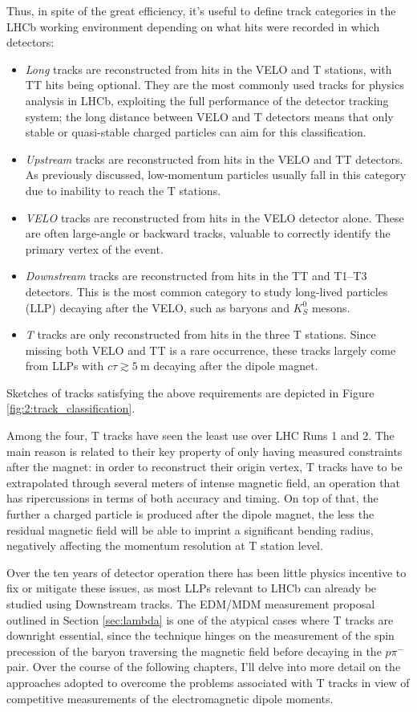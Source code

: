 Thus, in spite of the great efficiency, it's useful to define track categories in the LHCb working environment depending on what hits were recorded in which detectors:
\begin{itemize}
	\item \textit{Long} tracks are reconstructed from hits in the VELO and T stations, with TT hits being optional. They are the most commonly used tracks for physics analysis in LHCb, exploiting the full performance of the detector tracking system; the long distance between VELO and T detectors means that only stable or quasi-stable charged particles can aim for this classification.
	\item \textit{Upstream} tracks are reconstructed from hits in the VELO and TT detectors. As previously discussed, low-momentum particles usually fall in this category due to inability to reach the T stations.
	\item \textit{VELO} tracks are reconstructed from hits in the VELO detector alone. These are often large-angle or backward tracks, valuable to correctly identify the primary vertex of the event.
	\item \textit{Downstream} tracks are reconstructed from hits in the TT and T1--T3 detectors. This is the most common category to study long-lived particles (LLP) decaying after the VELO, such as \lz baryons and $K_S^0$ mesons.
	\item \textit{T} tracks are only reconstructed from hits in the three T stations. Since missing both VELO and TT is a rare occurrence, these tracks largely come from LLPs with $c\tau \gtrsim \SI{5}{\meter}$ decaying after the dipole magnet.
\end{itemize}
Sketches of tracks satisfying the above requirements are depicted in Figure \ref{fig:2:track_classification}.

Among the four, T tracks have seen the least use over LHC Runs 1 and 2.
The main reason is related to their key property of only having measured constraints after the magnet:
in order to reconstruct their origin vertex, T tracks have to be extrapolated through several meters of intense magnetic field, an operation that has ripercussions in terms of both accuracy and timing.
On top of that, the further a charged particle is produced after the dipole magnet, the less the residual magnetic field will be able to imprint a significant bending radius, negatively affecting the momentum resolution at T station level.

Over the ten years of detector operation there has been little physics incentive to fix or mitigate these issues, as most LLPs relevant to LHCb can already be studied using Downstream tracks.
The \lz EDM/MDM measurement proposal outlined in Section \ref{sec:lambda} is one of the atypical cases where T tracks are downright essential, since the technique hinges on the measurement of the spin precession of the baryon traversing the magnetic field before decaying in the $p\pi^-$ pair.
Over the course of the following chapters, I'll delve into more detail on the approaches adopted to overcome the problems associated with T tracks in view of competitive measurements of the \lz electromagnetic dipole moments.



